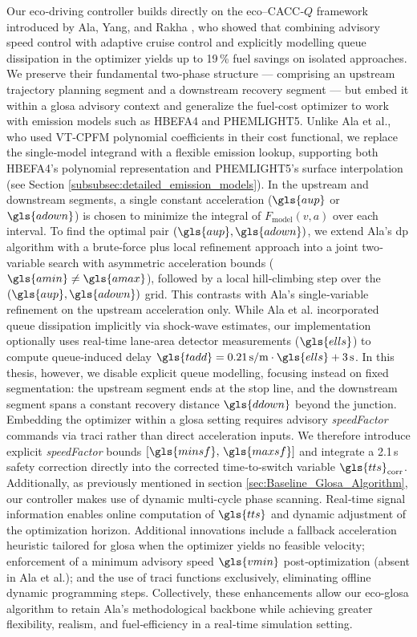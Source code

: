 Our eco‐driving controller builds directly on the eco–\ac{CACC}‐$Q$ framework introduced by Ala, Yang, and Rakha \cite{Ala2016}, who showed that combining advisory speed control with adaptive cruise control and explicitly modelling queue dissipation in the optimizer yields up to 19\,\% fuel savings on isolated approaches. We preserve their fundamental two‐phase structure --- comprising an upstream trajectory planning segment and a downstream recovery segment --- but embed it within a \ac{glosa} advisory context and generalize the fuel‐cost optimizer to work with emission models such as HBEFA4 and PHEMLIGHT5. 
\mynewline
Unlike Ala et al., who used VT‐CPFM polynomial coefficients in their cost functional, we replace the single‐model integrand with a flexible emission lookup, supporting both HBEFA4’s polynomial representation and PHEMLIGHT5’s surface interpolation (see Section \ref{subsubsec:detailed_emission_models}). In the upstream and downstream segments, a single constant acceleration ($\gls{aup}$ or $\gls{adown}$) is chosen to minimize the integral of $F_{\mathrm{model}}(v,a)$ over each interval. To find the optimal pair $(\gls{aup},\gls{adown})$, we extend Ala’s \ac{dp} algorithm with a brute‐force plus local refinement approach into a joint two‐variable search with asymmetric acceleration bounds ($\gls{amin}\neq\gls{amax}$), followed by a local hill‐climbing step over the $(\gls{aup},\gls{adown})$ grid. This contrasts with Ala’s single‐variable refinement on the upstream acceleration only.
\mynewline
While Ala et al. incorporated queue dissipation implicitly via shock‐wave estimates, our implementation optionally uses real‐time lane‐area detector measurements ($\gls{ells}$) to compute queue‐induced delay $\gls{tadd} = 0.21\,\text{s/m} \cdot \gls{ells} + 3\,\text{s}$. In this thesis, however, we disable explicit queue modelling, focusing instead on fixed segmentation: the upstream segment ends at the stop line, and the downstream segment spans a constant recovery distance $\gls{ddown}$ beyond the junction. 
\mynewline
Embedding the optimizer within a \ac{glosa} setting requires advisory \textit{speedFactor} commands via \ac{traci} rather than direct acceleration inputs. We therefore introduce explicit \textit{speedFactor} bounds $[\gls{minsf},\,\gls{maxsf}]$ and integrate a 2.1\,s safety correction directly into the corrected time‐to‐switch variable $\gls{tts}_{\mathrm{corr}}$. Additionally, as previously mentioned in section \ref{sec:Baseline_Glosa_Algorithm}, our controller makes use of dynamic multi-cycle phase scanning. Real‐time signal information enables online computation of $\gls{tts}$ and dynamic adjustment of the optimization horizon.
\newline
Additional innovations include a fallback acceleration heuristic tailored for \ac{glosa} when the optimizer yields no feasible velocity; enforcement of a minimum advisory speed $\gls{vmin}$ post‐optimization (absent in Ala et al.); and the use of \ac{traci} functions exclusively, eliminating offline dynamic programming steps. Collectively, these enhancements allow our \ac{eco-glosa} algorithm to retain Ala’s methodological backbone while achieving greater flexibility, realism, and fuel‐efficiency in a real‐time simulation setting.


